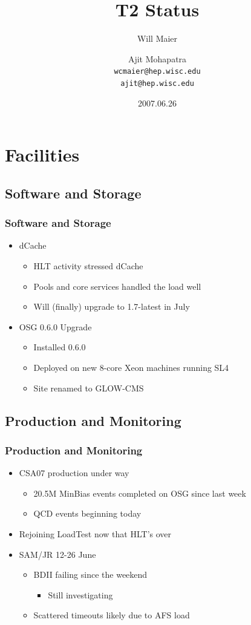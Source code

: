 \documentclass{beamer}
\title{T2 Status}
\author[Maier, Mohapatra]{
    Will Maier \and Ajit Mohapatra\\ 
    {\tt wcmaier@hep.wisc.edu}\\
    {\tt ajit@hep.wisc.edu}}
\institute[Wisconsin]{University of Wisconsin - High Energy Physics}
\date{2007.06.26}
\begin{document}
\begin{frame}
    \titlepage
\end{frame}

\section{Facilities}
\subsection{Software and Storage}
\begin{frame}
    \frametitle{Software and Storage}
    \begin{itemize}
        \item dCache
        \begin{itemize}
            \item HLT activity stressed dCache
            \item Pools and core services handled the load well
            \item Will (finally) upgrade to 1.7-latest in July
        \end{itemize}
        \item OSG 0.6.0 Upgrade
        \begin{itemize}
            \item Installed 0.6.0
            \item Deployed on new 8-core Xeon machines running SL4
            \item Site renamed to GLOW-CMS
        \end{itemize}
    \end{itemize}
\end{frame}

\subsection{Production and Monitoring}
\begin{frame}
    \frametitle{Production and Monitoring}
    \begin{itemize}
        \item CSA07 production under way
        \begin{itemize}
            \item 20.5M MinBias events completed on OSG since last week
            \item QCD events beginning today
        \end{itemize}
        \item Rejoining LoadTest now that HLT's over
        \item SAM/JR 12-26 June
        \begin{itemize}
            \item BDII failing since the weekend
            \begin{itemize}
                \item Still investigating
            \end{itemize}
            \item Scattered timeouts likely due to AFS load
        \end{itemize}
    \end{itemize}
\end{frame}
\end{document}

